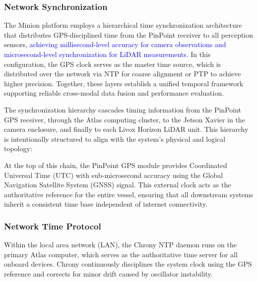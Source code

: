 \documentclass{erauthesis}
\begin{document}


\subsubsection{Network Synchronization} \label{time_sync_lan}

The Minion platform employs a hierarchical time synchronization architecture that distributes GPS-disciplined time from the PinPoint receiver to all perception sensors, \textcolor{blue}{achieving millisecond-level accuracy for camera observations and microsecond-level synchronization for LiDAR measurements. } 
In this configuration, the GPS clock serves as the master time source, which is distributed over the network via \ac{NTP} for coarse alignment or \ac{PTP} to achieve higher precision.
Together, these layers establish a unified temporal framework supporting reliable cross-modal data fusion and performance evaluation.

The synchronization hierarchy cascades timing information from the PinPoint GPS receiver, through the Atlas computing cluster, to the Jetson Xavier in the camera enclosure, and finally to each Livox Horizon LiDAR unit. This hierarchy is intentionally structured to align with the system’s physical and logical topology:


At the top of this chain, the PinPoint GPS module provides Coordinated Universal Time (UTC) with sub-microsecond accuracy using the Global Navigation Satellite System (GNSS) signal. This external clock acts as the authoritative reference for the entire vessel, ensuring that all downstream systems inherit a consistent time base independent of internet connectivity.

\subsubsection{Network Time Protocol} \label{NTP}
Within the local area network (LAN), the Chrony \ac{NTP} daemon runs on the primary Atlas computer, which serves as the authoritative time server for all onboard devices. Chrony continuously disciplines the system clock using the GPS reference and corrects for minor drift caused by oscillator instability.
\end{document}
